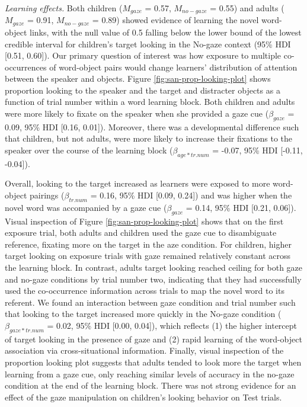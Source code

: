 \documentclass[10pt, letterpaper]{article}
\begin{document}
\emph{Learning effects.} Both children (\(M_{gaze}\) = 0.57,
\(M_{no-gaze}\) = 0.55) and adults (\(M_{gaze}\) = 0.91, \(M_{no-gaze}\)
= 0.89) showed evidence of learning the novel word-object links, with
the null value of 0.5 falling below the lower bound of the lowest
credible interval for children's target looking in the No-gaze context
(95\% HDI {[}0.51, 0.60{]}). Our primary question of interest was how
exposure to multiple co-occurrences of word-object pairs would change
learners' distribution of attention between the speaker and objects.
Figure \ref{fig:san-prop-looking-plot} shows proportion looking to the
speaker and the target and distracter objects as a function of trial
number within a word learning block. Both children and adults were more
likely to fixate on the speaker when she provided a gaze cue
(\(\beta_{gaze}\) = 0.09, 95\% HDI {[}0.16, 0.01{]}). Moreover, there
was a developmental difference such that children, but not adults, were
more likely to increase their fixations to the speaker over the course
of the learning block (\(\beta_{age*tr.num}\) = -0.07, 95\% HDI
{[}-0.11, -0.04{]}).

Overall, looking to the target increased as learners were exposed to
more word-object pairings (\(\beta_{tr.num}\) = 0.16, 95\% HDI {[}0.09,
0.24{]}) and was higher when the novel word was accompanied by a gaze
cue (\(\beta_{gaze}\) = 0.14, 95\% HDI {[}0.21, 0.06{]}). Visual
inspection of Figure \ref{fig:san-prop-looking-plot} shows that on the
first exposure trial, both adults and children used the gaze cue to
disambiguate reference, fixating more on the target in the aze
condition. For children, higher target looking on exposure trials with
gaze remained relatively constant across the learning block. In
contrast, adults target looking reached ceiling for both gaze and
no-gaze conditions by trial number two, indicating that they had
successfully used the co-occurrence information across trials to map the
novel word to its referent. We found an interaction between gaze
condition and trial number such that looking to the target increased
more quickly in the No-gaze condition (\(\beta_{gaze*tr.num}\) = 0.02,
95\% HDI {[}0.00, 0.04{]}), which reflects (1) the higher intercept of
target looking in the presence of gaze and (2) rapid learning of the
word-object association via cross-situational information. Finally,
visual inspection of the proportion looking plot suggests that adults
tended to look more the target when learning from a gaze cue, only
reaching similar levels of accuracy in the no-gaze condition at the end
of the learning block. There was not strong evidence for an effect of
the gaze manipulation on children's looking behavior on Test trials.
\end{document}
